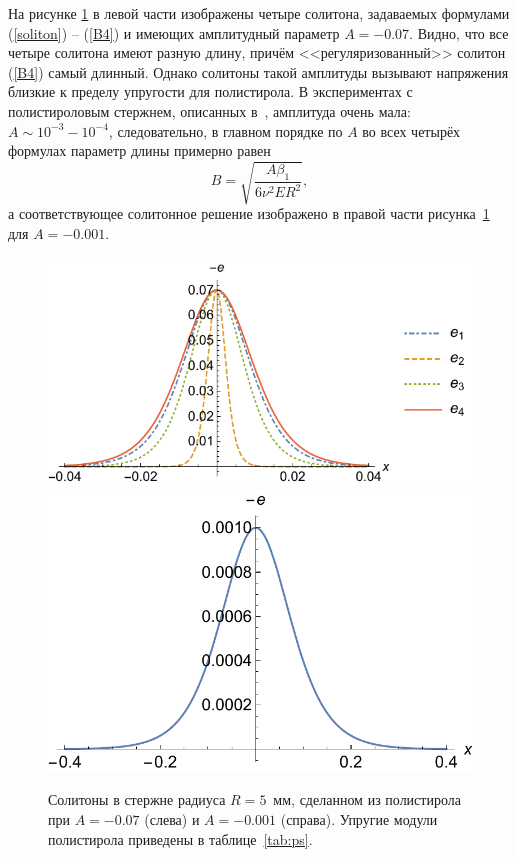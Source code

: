 \documentclass[12pt, a4paper]{report}
\begin{document}
На рисунке \ref{fig:soliton} в левой части изображены четыре солитона, задаваемых формулами (\ref{soliton}) -- (\ref{B4}) и имеющих амплитудный параметр $A = -0.07$. Видно, что все четыре солитона имеют разную длину, причём <<регуляризованный>> солитон (\ref{B4}) самый длинный. Однако солитоны такой амплитуды вызывают напряжения близкие к пределу упругости для полистирола. В экспериментах с полистироловым стержнем, описанных в~\cite{Garbuzov}, амплитуда очень мала: $A \sim 10^{-3} - 10^{-4}$, следовательно, в главном порядке по $A$ во всех четырёх формулах параметр длины примерно равен
\begin{equation}\label{}
B = \sqrt{\frac{A\beta_1}{6\nu^2 E R^2}},
\end{equation}
а соответствующее солитонное решение изображено в правой части рисунка~\ref{fig:soliton} для $A = -0.001$.
\begin{figure}[h]
	\centering
	\includegraphics[width=0.54\linewidth]{Fig3a}
	\includegraphics[width=0.42\linewidth]{Fig3b}
	\caption{Солитоны в стержне радиуса $R = 5$~мм, сделанном из полистирола при $A = -0.07$ (слева) и $A= -0.001$ (справа). Упругие модули полистирола приведены в таблице~\ref{tab:ps}.}
	\label{fig:soliton}
\end{figure}
\end{document}

